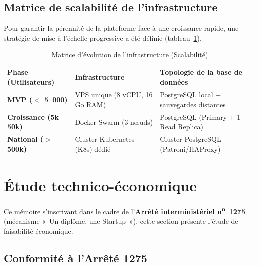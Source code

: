 \subsection{Matrice de scalabilité de l'infrastructure}

Pour garantir la pérennité de la plateforme face à une croissance rapide, une stratégie de mise à l'échelle progressive a été définie (tableau~\ref{tab:scalability}).

\begin{table}[H]
\centering
\footnotesize
\begin{tabularx}{\textwidth}{|l|l|X|}
\hline
\rowcolor{rohlight}
\textbf{Phase (Utilisateurs)} & \textbf{Infrastructure} & \textbf{Topologie de la base de données} \\
\hline
\textbf{MVP ($<$ 5~000)} & VPS unique (8 vCPU, 16 Go RAM) & PostgreSQL local + sauvegardes distantes \\
\hline
\textbf{Croissance (5k -- 50k)} & Docker Swarm (3 nœuds) & PostgreSQL (Primary + 1 Read Replica) \\
\hline
\textbf{National ($>$ 500k)} & Cluster Kubernetes (K8s) dédié & Cluster PostgreSQL (Patroni/HAProxy) \\
\hline
\end{tabularx}
  \caption{Matrice d'évolution de l'infrastructure (Scalabilité)}
  \label{tab:scalability}
\end{table}


\section{Étude technico-économique}
\label{sec:business}

Ce mémoire s'inscrivant dans le cadre de l'\textbf{Arrêté interministériel n\textsuperscript{o}~1275} (mécanisme «~Un diplôme, une Startup~»), cette section présente l'étude de faisabilité économique.

\subsection{Conformité à l'Arrêté 1275}

